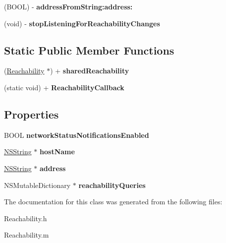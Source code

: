 \begin{DoxyCompactItemize}
\item 
\hypertarget{interface_reachability_aa12f7129934d05939b8cf3d21588c1d3}{
(BOOL) -\/ {\bfseries addressFromString:address:}}
\label{interface_reachability_aa12f7129934d05939b8cf3d21588c1d3}

\item 
\hypertarget{interface_reachability_a7b0aad2473839d800fcd0bb9699c6b04}{
(void) -\/ {\bfseries stopListeningForReachabilityChanges}}
\label{interface_reachability_a7b0aad2473839d800fcd0bb9699c6b04}

\end{DoxyCompactItemize}
\subsection*{Static Public Member Functions}
\begin{DoxyCompactItemize}
\item 
\hypertarget{interface_reachability_a56cb0023c24d53da6ced5b00471f698a}{
(\hyperlink{interface_reachability}{Reachability} $\ast$) + {\bfseries sharedReachability}}
\label{interface_reachability_a56cb0023c24d53da6ced5b00471f698a}

\item 
\hypertarget{interface_reachability_a9a6bb79747d4bdcfce495d572e8db6d2}{
(static void) + {\bfseries ReachabilityCallback}}
\label{interface_reachability_a9a6bb79747d4bdcfce495d572e8db6d2}

\end{DoxyCompactItemize}
\subsection*{Properties}
\begin{DoxyCompactItemize}
\item 
\hypertarget{interface_reachability_aa19e38ce7ae2d30733e3507f170a7c65}{
BOOL {\bfseries networkStatusNotificationsEnabled}}
\label{interface_reachability_aa19e38ce7ae2d30733e3507f170a7c65}

\item 
\hypertarget{interface_reachability_ab5e6cb602747f5c6cf592494c1e4c580}{
\hyperlink{class_n_s_string}{NSString} $\ast$ {\bfseries hostName}}
\label{interface_reachability_ab5e6cb602747f5c6cf592494c1e4c580}

\item 
\hypertarget{interface_reachability_a8528e6b8d9ad30ffa5e7c9d8f9b36f89}{
\hyperlink{class_n_s_string}{NSString} $\ast$ {\bfseries address}}
\label{interface_reachability_a8528e6b8d9ad30ffa5e7c9d8f9b36f89}

\item 
\hypertarget{interface_reachability_ab2b0107aa10ba953e9fb1b274e135305}{
NSMutableDictionary $\ast$ {\bfseries reachabilityQueries}}
\label{interface_reachability_ab2b0107aa10ba953e9fb1b274e135305}

\end{DoxyCompactItemize}


The documentation for this class was generated from the following files:\begin{DoxyCompactItemize}
\item 
Reachability.h\item 
Reachability.m\end{DoxyCompactItemize}
